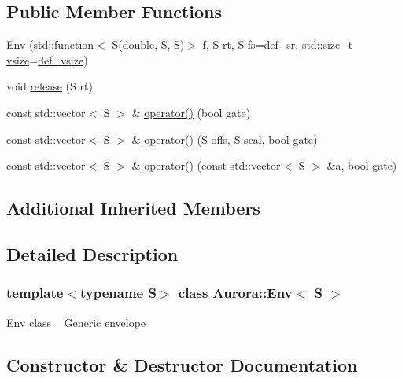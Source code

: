 \subsection*{Public Member Functions}
\begin{DoxyCompactItemize}
\item 
\hyperlink{class_aurora_1_1_env_a2ea7f7db3541bd36853d66423ee74b78}{Env} (std\+::function$<$ S(double, S, S)$>$ f, S rt, S fs=\hyperlink{namespace_aurora_ad49263d809bea98dd422e95bc91bc03e}{def\+\_\+sr}, std\+::size\+\_\+t \hyperlink{class_aurora_1_1_snd_base_ad68387541cc3d696d0cf58d474f94b73}{vsize}=\hyperlink{namespace_aurora_afaaddf667a06e7ce23c667a8b7295263}{def\+\_\+vsize})
\item 
void \hyperlink{class_aurora_1_1_env_a6591658018e04100709018bc86e94f31}{release} (S rt)
\item 
const std\+::vector$<$ S $>$ \& \hyperlink{class_aurora_1_1_env_a44666f7414faf21c568d20655d5e2761}{operator()} (bool gate)
\item 
const std\+::vector$<$ S $>$ \& \hyperlink{class_aurora_1_1_env_a2cf905d912ec6089b42922a92d4d7d5e}{operator()} (S offs, S scal, bool gate)
\item 
const std\+::vector$<$ S $>$ \& \hyperlink{class_aurora_1_1_env_a2a97a7e7211a8717957fd0f6f8afc81f}{operator()} (const std\+::vector$<$ S $>$ \&a, bool gate)
\end{DoxyCompactItemize}
\subsection*{Additional Inherited Members}


\subsection{Detailed Description}
\subsubsection*{template$<$typename S$>$\newline
class Aurora\+::\+Env$<$ S $>$}

\hyperlink{class_aurora_1_1_env}{Env} class ~\newline
Generic envelope 

\subsection{Constructor \& Destructor Documentation}
\mbox{\label{class_aurora_1_1_env_a2ea7f7db3541bd36853d66423ee74b78}} 
